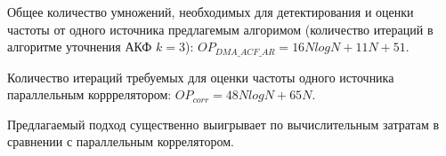 Общее количество умножений, необходимых для детектирования и оценки частоты от одного источника предлагемым
алгоримом (количество итераций в алгоритме уточнения АКФ ${k=3}$): ${OP_{DMA\_ACF\_AR} = 16NlogN + 11N + 51}$.

Количество итераций требуемых для оценки частоты одного источника параллельным корррелятором:
${OP_{corr} = 48NlogN + 65N}$.

Предлагаемый подход существенно выигрывает по вычислительным затратам в сравнении с параллельным коррелятором.


